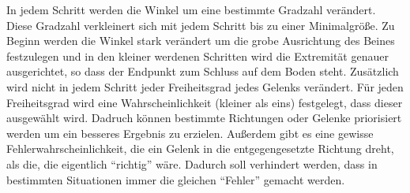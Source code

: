 In jedem Schritt werden die Winkel um eine bestimmte Gradzahl verändert. Diese Gradzahl verkleinert sich mit jedem Schritt bis zu einer Minimalgröße. Zu Beginn werden die Winkel stark verändert um die grobe Ausrichtung des Beines festzulegen und in den kleiner werdenen Schritten wird die Extremität genauer ausgerichtet, so dass der Endpunkt zum Schluss auf dem Boden steht.
Zusätzlich wird nicht in jedem Schritt jeder Freiheitsgrad jedes Gelenks verändert. Für jeden Freiheitsgrad wird eine Wahrscheinlichkeit (kleiner als eins) festgelegt, dass dieser ausgewählt wird. Dadruch können bestimmte Richtungen oder Gelenke priorisiert werden um ein besseres Ergebnis zu erzielen. 
Außerdem gibt es eine gewisse Fehlerwahrscheinlichkeit, die ein Gelenk in die entgegengesetzte Richtung dreht, als die, die eigentlich "`richtig"' wäre. Dadurch soll verhindert werden, dass in bestimmten Situationen immer die gleichen "`Fehler"' gemacht werden. 
